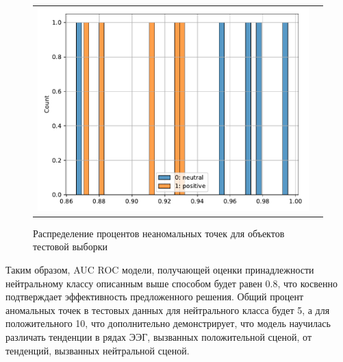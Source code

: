 \documentclass{article}
\begin{document}
\begin{figure}[h]
\begin{tabular}{cc}
  \includegraphics[width=160mm]{8.pdf}
\end{tabular}
\caption{Распределение процентов неаномальных точек для объектов тестовой выборки}
\end{figure}

Таким образом, AUC ROC модели, получающей оценки принадлежности нейтральному классу описанным выше способом будет равен 0.8, что косвенно подтверждает эффективность предложенного решения. Общий процент аномальных точек в тестовых данных для нейтрального класса будет 5, а для положительного 10, что дополнительно демонстрирует, что модель научилась различать тенденции в рядах ЭЭГ, вызванных положительной сценой, от тенденций, вызванных нейтральной сценой.
    


\end{document}
